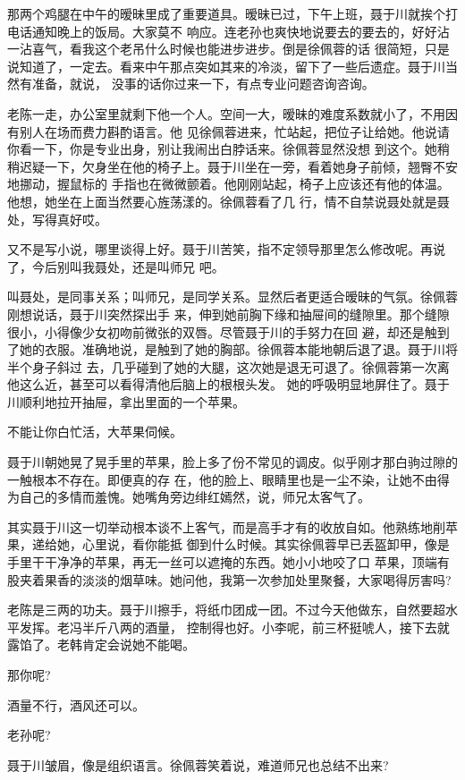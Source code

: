 \documentclass[11pt,a4paper,onecolumn]{article}
\begin{document}
那两个鸡腿在中午的暧昧里成了重要道具。暧昧已过，下午上班，聂于川就挨个打电话通知晚上的饭局。大家莫不
响应。连老孙也爽快地说要去的要去的，好好沾一沾喜气，看我这个老吊什么时候也能进步进步。倒是徐佩蓉的话
很简短，只是说知道了，一定去。看来中午那点突如其来的冷淡，留下了一些后遗症。聂于川当然有准备，就说，
没事的话你过来一下，有点专业问题咨询咨询。

老陈一走，办公室里就剩下他一个人。空间一大，暧昧的难度系数就小了，不用因有别人在场而费力斟酌语言。他
见徐佩蓉进来，忙站起，把位子让给她。他说请你看一下，你是专业出身，别让我闹出白脖话来。徐佩蓉显然没想
到这个。她稍稍迟疑一下，欠身坐在他的椅子上。聂于川坐在一旁，看着她身子前倾，翘臀不安地挪动，握鼠标的
手指也在微微颤着。他刚刚站起，椅子上应该还有他的体温。他想，她坐在上面当然要心旌荡漾的。徐佩蓉看了几
行，情不自禁说聂处就是聂处，写得真好哎。

又不是写小说，哪里谈得上好。聂于川苦笑，指不定领导那里怎么修改呢。再说了，今后别叫我聂处，还是叫师兄
吧。

叫聂处，是同事关系；叫师兄，是同学关系。显然后者更适合暧昧的气氛。徐佩蓉刚想说话，聂于川突然探出手
来，伸到她前胸下缘和抽屉间的缝隙里。那个缝隙很小，小得像少女初吻前微张的双唇。尽管聂于川的手努力在回
避，却还是触到了她的衣服。准确地说，是触到了她的胸部。徐佩蓉本能地朝后退了退。聂于川将半个身子斜过
去，几乎碰到了她的大腿，这次她是退无可退了。徐佩蓉第一次离他这么近，甚至可以看得清他后脑上的根根头发。
她的呼吸明显地屏住了。聂于川顺利地拉开抽屉，拿出里面的一个苹果。

不能让你白忙活，大苹果伺候。

聂于川朝她晃了晃手里的苹果，脸上多了份不常见的调皮。似乎刚才那白驹过隙的一触根本不存在。即便真的存
在，他的脸上、眼睛里也是一尘不染，让她不由得为自己的多情而羞愧。她嘴角旁边绯红嫣然，说，师兄太客气了。

其实聂于川这一切举动根本谈不上客气，而是高手才有的收放自如。他熟练地削苹果，递给她，心里说，看你能抵
御到什么时候。其实徐佩蓉早已丢盔卸甲，像是手里干干净净的苹果，再无一丝可以遮掩的东西。她小小地咬了口
苹果，顶端有股夹着果香的淡淡的烟草味。她问他，我第一次参加处里聚餐，大家喝得厉害吗?

老陈是三两的功夫。聂于川擦手，将纸巾团成一团。不过今天他做东，自然要超水平发挥。老冯半斤八两的酒量，
控制得也好。小李呢，前三杯挺唬人，接下去就露馅了。老韩肯定会说她不能喝。

那你呢?

酒量不行，酒风还可以。

老孙呢?

聂于川皱眉，像是组织语言。徐佩蓉笑着说，难道师兄也总结不出来?
\end{document}
